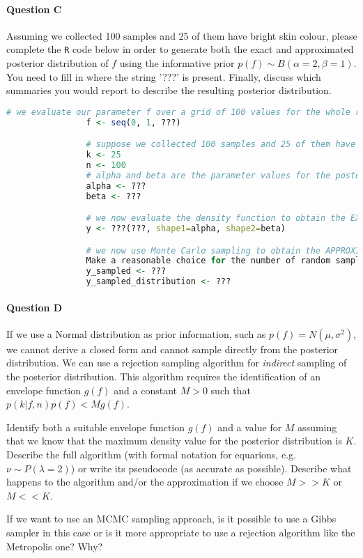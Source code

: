         \paragraph{Question C}

        Assuming we collected 100 samples and 25 of them have bright skin colour,
        please complete the \texttt{R} code below in order to generate both the exact
        and approximated posterior distribution of $f$ using the informative
        prior $p(f) \sim B(\alpha=2,\beta=1)$.
        You need to fill in where the string '???' is present.
        Finally, discuss which summaries you would report to describe the resulting posterior
        distribution.
	\begin{lstlisting}[language=R]
                # we evaluate our parameter f over a grid of 100 values for the whole range [0,1]
                f <- seq(0, 1, ???)

                # suppose we collected 100 samples and 25 of them have bright skin colour
                k <- 25
                n <- 100
                # alpha and beta are the parameter values for the posterior Beta distribution
                alpha <- ???
                beta <- ???

                # we now evaluate the density function to obtain the EXACT posterior distribution
                y <- ???(???, shape1=alpha, shape2=beta)

                # we now use Monte Carlo sampling to obtain the APPROXIMATED posterior distribution.
                Make a reasonable choice for the number of random samples.
                y_sampled <- ???
                y_sampled_distribution <- ???

        \end{lstlisting}

        \paragraph{Question D}

	If we use a Normal distribution as prior information, such as
        $p(f)=N(\mu,\sigma^2)$, we cannot derive a closed form and cannot sample
        directly from the posterior distribution.
        We can use a rejection sampling algorithm for \textit{indirect} sampling of the
        posterior distribution.
        This algorithm requires the identification of an envelope function $g(f)$ and a
        constant $M>0$ such that $p(k|f,n)p(f)<Mg(f)$.

        Identify both a suitable envelope function $g(f)$ and a value for $M$ assuming that
        we know that the maximum density value for the posterior distribution is $K$.
        Describe the full algorithm (with formal notation for equarions, e.g. $\nu \sim P(\lambda=2)$)
        or write its pseudocode (as accurate as possible).
        Describe what happens to the algorithm and/or the approximation if we
        choose $M>>K$ or $M<<K$.

        If we want to use an MCMC sampling approach, is it possible to use a Gibbs sampler in this case
        or is it more appropriate to use a rejection algorithm like the Metropolis one? Why?


